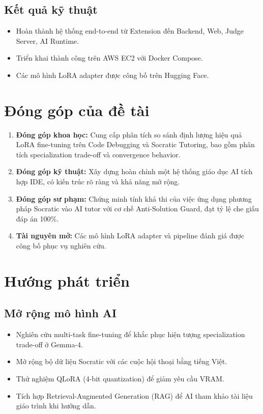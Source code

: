 \subsection{Kết quả kỹ thuật}

\begin{itemize}
    \item Hoàn thành hệ thống end-to-end từ Extension đến Backend, Web, Judge Server, AI Runtime.
    \item Triển khai thành công trên AWS EC2 với Docker Compose.
    \item Các mô hình LoRA adapter được công bố trên Hugging Face.
\end{itemize}

\section{Đóng góp của đề tài}

\begin{enumerate}
    \item \textbf{Đóng góp khoa học:} Cung cấp phân tích so sánh định lượng hiệu quả LoRA fine-tuning trên Code Debugging và Socratic Tutoring, bao gồm phân tích specialization trade-off và convergence behavior.
    \item \textbf{Đóng góp kỹ thuật:} Xây dựng hoàn chỉnh một hệ thống giáo dục AI tích hợp IDE, có kiến trúc rõ ràng và khả năng mở rộng.
    \item \textbf{Đóng góp sư phạm:} Chứng minh tính khả thi của việc ứng dụng phương pháp Socratic vào AI tutor với cơ chế Anti-Solution Guard, đạt tỷ lệ che giấu đáp án 100\%.
    \item \textbf{Tài nguyên mở:} Các mô hình LoRA adapter và pipeline đánh giá được công bố phục vụ nghiên cứu.
\end{enumerate}

\section{Hướng phát triển}

\subsection{Mở rộng mô hình AI}

\begin{itemize}
    \item Nghiên cứu multi-task fine-tuning để khắc phục hiện tượng specialization trade-off ở Gemma-4.
    \item Mở rộng bộ dữ liệu Socratic với các cuộc hội thoại bằng tiếng Việt.
    \item Thử nghiệm QLoRA (4-bit quantization) để giảm yêu cầu VRAM.
    \item Tích hợp Retrieval-Augmented Generation (RAG) để AI tham khảo tài liệu giáo trình khi hướng dẫn.
\end{itemize}

